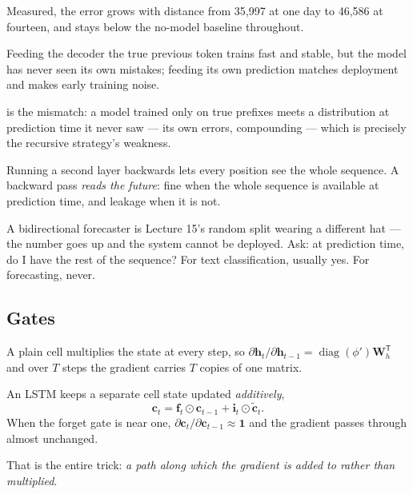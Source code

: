 \documentclass[11pt,a4paper]{article}
\begin{document}
Measured, the error grows with distance from 35{,}997 at one day to 46{,}586 at
fourteen, and stays below the no-model baseline throughout.

\begin{keybox}[title={Teacher forcing, and what it costs}]
Feeding the decoder the true previous token trains fast and stable, but the
model has never seen its own mistakes; feeding its own prediction matches
deployment and makes early training noise.

 is the mismatch: a model trained only on true prefixes
meets a distribution at prediction time it never saw --- its own errors,
compounding --- which is precisely the recursive strategy's weakness.
\end{keybox}

\begin{failbox}[title={Failure condition --- bidirectional layers, and the one question}]
Running a second layer backwards lets every position see the whole sequence. A
backward pass \emph{reads the future}: fine when the whole sequence is
available at prediction time, and leakage when it is not.

A bidirectional forecaster is Lecture 15's random split wearing a different
hat --- the number goes up and the system cannot be deployed. Ask: at
prediction time, do I have the rest of the sequence? For text classification,
usually yes. For forecasting, never.
\end{failbox}

\subsection{Gates}

A plain cell multiplies the state at every step, so
$\partial\mathbf{h}_t/\partial\mathbf{h}_{t-1} =
\operatorname{diag}(\phi')\mathbf{W}_h^{\mathsf T}$ and over $T$ steps the
gradient carries $T$ copies of one matrix.

\begin{derivbox}[title={What a gated cell does instead}]
An LSTM keeps a separate cell state updated \emph{additively},
\[ \mathbf{c}_t = \mathbf{f}_t \odot \mathbf{c}_{t-1}
                + \mathbf{i}_t \odot \tilde{\mathbf{c}}_t. \]
When the forget gate is near one,
$\partial\mathbf{c}_t/\partial\mathbf{c}_{t-1} \approx \mathbf{1}$ and the
gradient passes through almost unchanged.

That is the entire trick: \emph{a path along which the gradient is added to
rather than multiplied}.
\end{derivbox}
\end{document}
